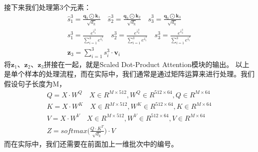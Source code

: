 \documentclass{article}
\begin{document}
接下来我们处理第3个元素：
\begin{equation}
\begin{aligned}
\hat{s}_{1}^{3} = \frac{ \boldsymbol{q}_3 \bigodot \boldsymbol{k}_1 }{ \sqrt{d_{k}} } \quad 
\hat{s}_{2}^{3} = \frac{ \boldsymbol{q}_3 \bigodot \boldsymbol{k}_2 }{ \sqrt{d_{k}} } \quad 
\hat{s}_{3}^{3} = \frac{ \boldsymbol{q}_3 \bigodot \boldsymbol{k}_3 }{ \sqrt{d_{k}} } \\
s_{1}^{3} = \frac{ e^{\hat{s}_{1}^{3}} }{ \sum_{i=1}^{3} e^{\hat{s}_{i}^{3}} } \quad 
s_{2}^{3} = \frac{ e^{\hat{s}_{2}^{3}} }{ \sum_{i=1}^{3} e^{\hat{s}_{i}^{3}} } \quad 
s_{3}^{3} = \frac{ e^{\hat{s}_{3}^{3}} }{ \sum_{i=1}^{3} e^{\hat{s}_{i}^{3}} } \\
\boldsymbol{z}_{3} = \sum_{i=1}^{3} s_{i}^{3} \cdot \boldsymbol{v}_i
\end{aligned}
\label{e000111}
\end{equation}
将$\boldsymbol{z}_1$、$\boldsymbol{z}_2$、$\boldsymbol{z}_3$拼接在一起，就是Scaled Dot-Product 
Attention模块的输出。\newline
以上是单个样本的处理流程，而在实际中，我们通常是通过矩阵运算来进行处理。我们假设句子长度为M，
\begin{equation}
\begin{aligned}
Q = X \cdot W^{Q} \quad X \in R^{M \times 512}, W^{Q} \in R^{512 \times 64}, Q \in R^{M \times 64} \\
K = X \cdot W^{K} \quad X \in R^{M \times 512}, W^{K} \in R^{512 \times 64}, K \in R^{M \times 64} \\
V = X \cdot W^{V} \quad X \in R^{M \times 512}, W^{V} \in R^{512 \times 64}, V \in R^{M \times 64} \\
Z = softmax \bigg( \frac{Q \cdot K^{T}}{\sqrt{d_{k}}} \bigg) \cdot V
\end{aligned}
\label{e000112}
\end{equation}
而在实际中，我们还需要在前面加上一维批次中的编号。
\end{document}

